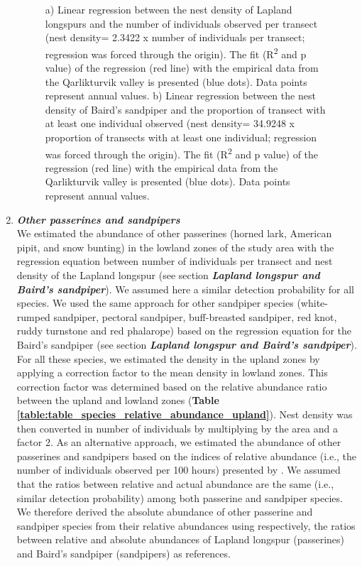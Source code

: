 \documentclass[a4paper,twoside,12pt]{article}
\begin{document}
\begin{enumerate}[label=\alph*.]
\begin{figure}[H]
\begin{subfigure}{0.5\textwidth}
                \caption{}
                \end{subfigure}
                \caption{a) Linear regression between the nest density of Lapland longspurs and the number of individuals observed per transect (nest density= 2.3422 x number of individuals per transect; regression was forced through the origin). The fit (R\textsuperscript{2} and p value) of the regression (red line) with the empirical data from the Qarlikturvik valley is presented (blue dots). Data points represent annual values. b) Linear regression between the nest density of Baird’s sandpiper and the proportion of transect with at least one individual observed (nest density= 34.9248 x proportion of transects with at least one individual; regression was forced through the origin). The fit (R\textsuperscript{2} and p value) of the regression (red line) with the empirical data from the Qarlikturvik valley is presented (blue dots). Data points represent annual values.}
                \label{figure:lalo_basa}
                \end{figure} 
                \item[] \textit{\textbf{Other passerines and sandpipers}}\\
                We estimated the abundance of other passerines (horned lark, American pipit, and snow bunting) in the lowland zones of the study area with the regression equation between number of individuals per transect and nest density of the Lapland longspur (see section \textit{\textbf{Lapland longspur and Baird’s sandpiper}}). We assumed here a similar detection probability for all species. We used the same approach for other sandpiper species (white-rumped sandpiper, pectoral sandpiper, buff-breasted sandpiper, red knot, ruddy turnstone and red phalarope) based on the regression equation for the Baird's sandpiper (see section \textit{\textbf{Lapland longspur and Baird’s sandpiper}}). For all these species, we estimated the density in the upland zones by applying a correction factor to the mean density in lowland zones. This correction factor was determined based on the relative abundance ratio between the upland and lowland zones (\textbf{Table \ref{table:table_species_relative_abundance_upland}}). Nest density was then converted in number of individuals by multiplying by the area and a factor 2.
As an alternative approach, we estimated the abundance of other passerines and sandpipers based on the indices of relative abundance (i.e., the number of individuals observed per 100 hours) presented by \citet{gauthier2024a}. We assumed that the ratios between relative and actual abundance are the same (i.e., similar detection probability) among both passerine and sandpiper species. We therefore derived the absolute abundance of other passerine and sandpiper species from their relative abundances using respectively, the ratios between relative and absolute abundances of Lapland longspur (passerines) and Baird’s sandpiper (sandpipers) as references.

\end{enumerate}
\end{document}
